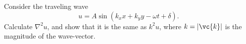 Consider the traveling wave
\begin{equation*}
  u = A\sin(k_x x+k_y y-\omega t+\delta).
\end{equation*}
Calculate $\nabla^2 u$, and show that it is the same
as $k^2 u$, where $k=|\vc{k}|$ is the magnitude of the
wave-vector.
